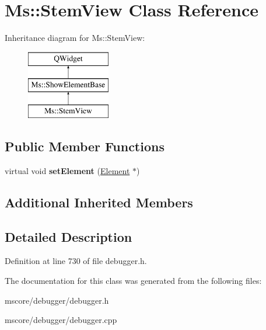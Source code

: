 \hypertarget{class_ms_1_1_stem_view}{}\section{Ms\+:\+:Stem\+View Class Reference}
\label{class_ms_1_1_stem_view}
Inheritance diagram for Ms\+:\+:Stem\+View\+:\begin{figure}[H]
\begin{center}
\leavevmode
\includegraphics[height=3.000000cm]{class_ms_1_1_stem_view}
\end{center}
\end{figure}
\subsection*{Public Member Functions}
\begin{DoxyCompactItemize}
\item 
\mbox{\label{class_ms_1_1_stem_view_acd17972292ef9c50b1fea9aeacd9551b}} 
virtual void {\bfseries set\+Element} (\hyperlink{class_ms_1_1_element}{Element} $\ast$)
\end{DoxyCompactItemize}
\subsection*{Additional Inherited Members}


\subsection{Detailed Description}


Definition at line 730 of file debugger.\+h.



The documentation for this class was generated from the following files\+:\begin{DoxyCompactItemize}
\item 
mscore/debugger/debugger.\+h\item 
mscore/debugger/debugger.\+cpp\end{DoxyCompactItemize}

